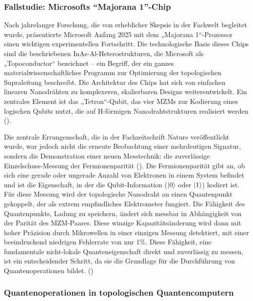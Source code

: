 \subsubsection{Fallstudie: Microsofts ``Majorana 1''-Chip}

Nach jahrelanger Forschung, die von erheblicher Skepsis in der Fachwelt begleitet wurde, präsentierte Microsoft Anfang 2025 mit dem „Majorana 1“-Prozessor einen wichtigen experimentellen Fortschritt. Die technologische Basis dieses Chips sind die beschriebenen InAs-Al-Heterostrukturen, die Microsoft als „Topoconductor“ bezeichnet – ein Begriff, der ein ganzes materialwissenschaftliches Programm zur Optimierung der topologischen Supraleitung beschreibt. Die Architektur des Chips hat sich von einfachen linearen Nanodrähten zu komplexeren, skalierbaren Designs weiterentwickelt. Ein zentrales Element ist das „Tetron“-Qubit, das vier MZMs zur Kodierung eines logischen Qubits nutzt, die auf H-förmigen Nanodrahtstrukturen realisiert werden (\cite{bolgarMicrosoftsMajorana1}).

Die zentrale Errungenschaft, die in der Fachzeitschrift Nature veröffentlicht wurde, war jedoch nicht die erneute Beobachtung einer mehrdeutigen Signatur, sondern die Demonstration einer neuen Messtechnik: die zuverlässige Einzelschuss-Messung der Fermionenparität (\cite{PDFMicrosoftsMajorana2025}). Die Fermionenparität gibt an, ob sich eine gerade oder ungerade Anzahl von Elektronen in einem System befindet und ist die Eigenschaft, in der die Qubit-Information ($\ket{0}$ oder $\ket{1}$) kodiert ist.
Für diese Messung wird der topologische Nanodraht an einen Quantenpunkt gekoppelt, der als extrem empfindliches Elektrometer fungiert. Die Fähigkeit des Quantenpunkts, Ladung zu speichern, ändert sich messbar in Abhängigkeit von der Parität des MZM-Paares. Diese winzige Kapazitätsänderung wird dann mit hoher Präzision durch Mikrowellen in einer einzigen Messung detektiert, mit einer beeindruckend niedrigen Fehlerrate von nur 1\%. Diese Fähigkeit, eine fundamentale nicht-lokale Quanteneigenschaft direkt und zuverlässig zu messen, ist ein entscheidender Schritt, da sie die Grundlage für die Durchführung von Quantenoperationen bildet. (\cite{PDFMicrosoftsMajorana2025})


\subsubsection{Quantenoperationen in topologischen Quantencomputern}

